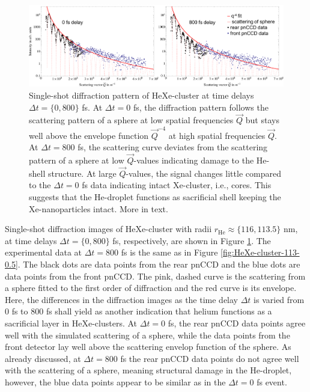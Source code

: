 \begin{figure}
	\centering
		\includegraphics[width=1.00\textwidth]{images/results/HeXe-comparison-0-800-fs.png}
	\caption[Single-shot diffraction patterns of HeXe-cluster at different time delays]{Single-shot diffraction pattern of HeXe-cluster at time delays $\Delta t =\{0,800\}$ fs. At $\Delta t=0$ fs, the diffraction pattern follows the scattering pattern of a sphere at low spatial frequencies $\vec{Q}$ but stays well above the envelope function $\vec{Q}^{-4}$ at high spatial frequencies $\vec{Q}$. At $\Delta t=800$ fs, the scattering curve deviates from the scattering pattern of a sphere at low $\vec{Q}$-values indicating damage to the He-shell structure. At large $\vec{Q}$-values, the signal changes little compared to the $\Delta t=0$ fs data indicating intact Xe-cluster, i.e., cores. This suggests that the He-droplet functions as sacrificial shell keeping the Xe-nanoparticles intact. More in text.}
	\label{fig:HeXe-comparison-0-800-fs}
\end{figure}
Single-shot diffraction images of HeXe-cluster with radii $r_{\text{He}}\approx\{116, 113.5\}$ nm, at time delays $\Delta t =\{0,800\}$ fs, respectively, are shown in Figure \ref{fig:HeXe-comparison-0-800-fs}. The experimental data at $\Delta t = 800$ fs is the same as in Figure \ref{fig:HeXe-cluster-113-0.5}. The black dots are data points from the rear pnCCD and the blue dots are data points from the front pnCCD. The pink, dashed curve is the scattering from a sphere fitted to the first order of diffraction and the red curve is its envelope. Here, the differences in the diffraction images as the time delay $\Delta t$ is varied from 0 fs to 800 fs shall yield as another indication that helium functions as a sacrificial layer in HeXe-clusters. At $\Delta t=0$ fs, the rear pnCCD data points agree well with the simulated scattering of a sphere, while the data points from the front detector lay well above the scattering envelop function of the sphere. As already discussed, at $\Delta t = 800$ fs the rear pnCCD data points do not agree well with the scattering of a sphere, meaning structural damage in the He-droplet, however, the blue data points appear to be similar as in the $\Delta t=0$ fs event.\\
